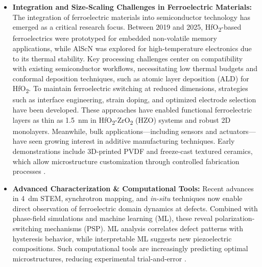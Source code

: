 \documentclass[a4paper,fleqn]{cas-sc}
\begin{document}
\begin{itemize}
    \item \textbf{Integration and Size-Scaling Challenges in Ferroelectric Materials:} The integration of ferroelectric materials into semiconductor technology has emerged as a critical research focus. Between 2019 and 2025, HfO\textsubscript{2}-based ferroelectrics were prototyped for embedded non-volatile memory applications, while AlScN was explored for high-temperature electronics due to its thermal stability. Key processing challenges center on compatibility with existing semiconductor workflows, necessitating low thermal budgets and conformal deposition techniques, such as atomic layer deposition (ALD) for HfO\textsubscript{2}. To maintain ferroelectric switching at reduced dimensions, strategies such as interface engineering, strain doping, and optimized electrode selection have been developed. These approaches have enabled functional ferroelectric layers as thin as 1.5\, nm in HfO\textsubscript{2}-ZrO\textsubscript{2} (HZO) systems and robust 2D monolayers. Meanwhile, bulk applications—including sensors and actuators—have seen growing interest in additive manufacturing techniques. Early demonstrations include 3D-printed PVDF and freeze-cast textured ceramics, which allow microstructure customization through controlled fabrication processes \cite{zhang2024new,shi2023interface,cho2024atomic}.
    
    \item \textbf{Advanced Characterization \& Computational Tools:} Recent advances in \SI{4}{\deci\meter} STEM, synchrotron mapping, and \textit{in-situ} techniques now enable direct observation of ferroelectric domain dynamics at defects. Combined with phase-field simulations and machine learning (ML), these reveal polarization-switching mechanisms (PSP). ML analysis correlates  defect patterns with hysteresis behavior, while interpretable ML suggests new piezoelectric compositions. Such computational tools are increasingly predicting optimal microstructures, reducing experimental trial-and-error \cite{zhu2025ultrahigh,alhada2025elucidating,tan2015unfolding,zhang2024new }.
    

\end{itemize}
\end{document}
